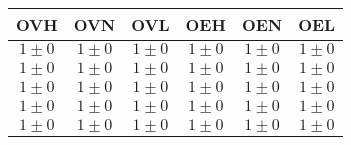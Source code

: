 \begin{tabular}{|c|c|c|c|c|c|}
\hline 
OVH & OVN & OVL & OEH & OEN & OEL\\ 
\hline 
\hline 
$1\pm0$ & $1\pm0$ & $1\pm0$ & $1\pm0$ & $1\pm0$ & $1\pm0$ \\ 
\hline 
$1\pm0$ & $1\pm0$ & $1\pm0$ & $1\pm0$ & $1\pm0$ & $1\pm0$ \\ 
\hline 
$1\pm0$ & $1\pm0$ & $1\pm0$ & $1\pm0$ & $1\pm0$ & $1\pm0$ \\ 
\hline 
$1\pm0$ & $1\pm0$ & $1\pm0$ & $1\pm0$ & $1\pm0$ & $1\pm0$ \\ 
\hline 
$1\pm0$ & $1\pm0$ & $1\pm0$ & $1\pm0$ & $1\pm0$ & $1\pm0$ \\ 
\hline 
\end{tabular}